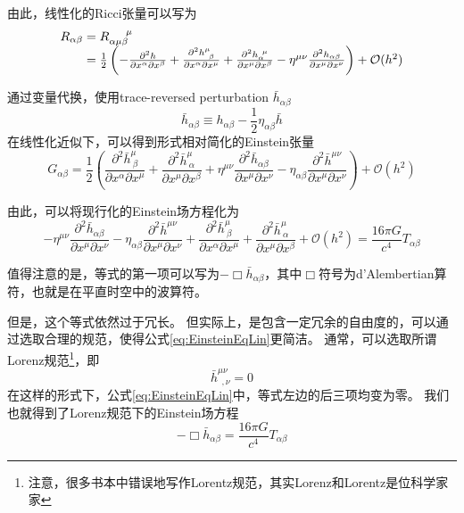 由此，线性化的Ricci张量可以写为
\begin{equation}\label{eq:RicciTensorLin}
\begin{array}{r@{}l}
  R_{\alpha\beta} &{}= R_{\alpha\mu\beta} ^{\quad\ \mu}\\
                  &{}= \frac{1}{2}\left(- \frac{\partial^2 h}{\partial x^\alpha \partial x^\beta} + \frac{\partial^2 h^\mu_{~\beta}}{\partial x^\alpha \partial x^\mu} + \frac{\partial^2 h_{\alpha}^{~\mu}}{\partial x^\mu \partial x^\beta} - \eta^{\mu\nu}\frac{\partial^2 h_{\alpha\beta}}{\partial x^\mu \partial x^\nu}  \right)+ \mathcal{O}(h^2)
\end{array}
\end{equation}

通过变量代换，使用trace-reversed perturbation $\bar{h}_{\alpha\beta}$
\begin{equation}\label{eq:TraRev} 
  \bar{h}_{\alpha\beta} \equiv h_{\alpha\beta} - \frac{1}{2}\eta_{\alpha\beta}\bar{h}
\end{equation}
在线性化近似下，可以得到形式相对简化的Einstein张量
\begin{equation}\label{eq:EinsteinTensorLin}
  G_{\alpha\beta}  = \frac{1}{2}\left( \frac{\partial^2 \bar{h}^\mu_{~\beta}}{\partial x^\alpha \partial x^\mu} + \frac{\partial^2 \bar{h}^\mu_{~\alpha}}{\partial x^\mu \partial x^\beta} + \eta^{\mu\nu}\frac{\partial^2 \bar{h}_{\alpha\beta}}{\partial x^\mu \partial x^\nu} - \eta_{\alpha\beta}\frac{\partial^2 \bar{h}^{\mu\nu}}{\partial x^\mu \partial x^\nu}  \right)+ \mathcal{O}(h^2)
\end{equation}

由此，可以将现行化的Einstein场方程化为
\begin{equation}\label{eq:EinsteinEqLin}
  - \eta^{\mu\nu} \frac{\partial^2 \bar{h}_{\alpha\beta}}{\partial x^\mu \partial x^\nu} 
  - \eta_{\alpha\beta}\frac{\partial^2 \bar{h}^{\mu\nu}}{\partial x^\mu \partial x^\nu} 
  + \frac{\partial^2 \bar{h}^\mu_{~\beta}}{\partial x^\alpha \partial x^\mu} 
  + \frac{\partial^2 \bar{h}^{\mu}_{~\alpha}}{\partial x^\mu \partial x^\beta}  
  + \mathcal{O}(h^2) = \frac{16\pi G}{c^4} T_{\alpha\beta}
\end{equation}

值得注意的是，等式的第一项可以写为$-\Box\bar{h}_{\alpha\beta}$，其中$\Box$符号为d’Alembertian算符，也就是在平直时空中的波算符。

但是，这个等式依然过于冗长。
但实际上，\GR 是包含一定冗余的自由度的，可以通过选取合理的规范，使得公式\ref{eq:EinsteinEqLin}更简洁。
通常，可以选取所谓Lorenz规范\footnote{注意，很多书本中错误地写作Lorentz规范，其实Lorenz和Lorentz是位科学家家}，即
\begin{equation}\label{eq:LorenzGauge}
  \bar{h}^{\mu\nu}_{~~,\nu} = 0
\end{equation}
在这样的形式下，公式\ref{eq:EinsteinEqLin}中，等式左边的后三项均变为零。
我们也就得到了Lorenz规范下的Einstein场方程
\begin{equation}\label{eq:EinsteinEqLorenzGauge}
  -\Box\bar{h}_{\alpha\beta}= \frac{16\pi G}{c^4} T_{\alpha\beta}
\end{equation}


